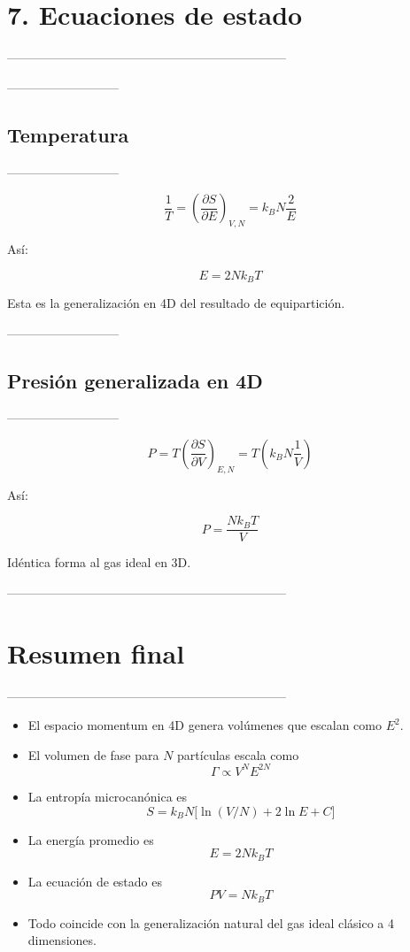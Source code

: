 \documentclass{article}
\begin{document}
\section*{\textcolor{Apple Green}{7. Ecuaciones de estado}}
--------------------------------------------------------------------

---------------------------
\subsection*{Temperatura}
---------------------------

\[
\frac{1}{T}
= \left(\frac{\partial S}{\partial E}\right)_{V,N}
= k_{B}N\frac{2}{E}
\]

Así:

\[
\boxed{
E = 2Nk_{B}T
}
\]

Esta es la generalización en 4D del resultado de equipartición.

---------------------------
\subsection*{Presión generalizada en 4D}
---------------------------

\[
P = T\left(\frac{\partial S}{\partial V}\right)_{E,N}
= T \left(k_{B}N\frac{1}{V}\right)
\]

Así:

\[
\boxed{
P = \frac{Nk_{B}T}{V}
}
\]

Idéntica forma al gas ideal en 3D.

--------------------------------------------------------------------
\section*{\textcolor{Tarawera}{Resumen final}}
--------------------------------------------------------------------

\begin{itemize}
  \item El espacio momentum en 4D genera volúmenes que escalan como \(E^{2}\).
  \item El volumen de fase para \(N\) partículas escala como  
  \[
  \Gamma \propto V^{N}E^{2N}
  \]
  \item La entropía microcanónica es  
  \[
  S = k_{B}N\big[\ln(V/N) + 2\ln E + C\big]
  \]
  \item La energía promedio es  
  \[
  E = 2Nk_{B}T
  \]
  \item La ecuación de estado es  
  \[
  PV = Nk_{B}T
  \]
  \item Todo coincide con la generalización natural del gas ideal clásico a 4 dimensiones.
\end{itemize}
\end{document}

